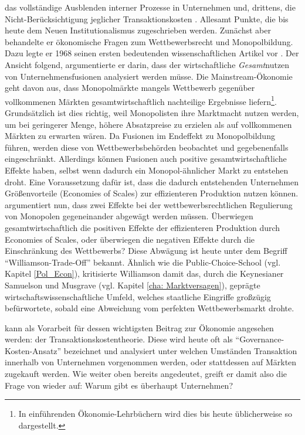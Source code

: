 das vollständige Ausblenden interner Prozesse in Unternehmen und, drittens, die Nicht-Berücksichtigung jeglicher Transaktionskosten \parencite{Williamson2009}. Allesamt Punkte, die bis heute dem Neuen Institutionalismus zugeschrieben werden. Zunächst aber behandelte er ökonomische Fragen zum Wettbewerbsrecht und Monopolbildung. Dazu legte er 1968 seinen ersten bedeutenden wissenschaftlichen Artikel vor \parencite{Williamson1968}. Der Ansicht \textcite{Coase1960, Coase1937} folgend, argumentierte er darin, dass der wirtschaftliche \textit{Gesamt}nutzen von Unternehmensfusionen analysiert werden müsse. Die Mainstream-Ökonomie geht davon aus, dass Monopolmärkte mangels Wettbewerb gegenüber vollkommenen Märkten gesamtwirtschaftlich nachteilige Ergebnisse liefern\footnote{In einführenden Ökonomie-Lehrbüchern wird dies bis heute üblicherweise so dargestellt.}. Grundsätzlich ist dies richtig, weil Monopolisten ihre Marktmacht nutzen werden, um bei geringerer Menge, höhere Absatzpreise zu erzielen als auf vollkommenen Märkten zu erwarten wären. Da Fusionen im Endeffekt zu Monopolbildung führen, werden diese von Wettbewerbsbehörden beobachtet und gegebenenfalls eingeschränkt. Allerdings können Fusionen auch positive gesamtwirtschaftliche Effekte haben, selbst wenn dadurch ein Monopol-ähnlicher Markt zu entstehen droht. Eine Voraussetzung dafür ist, dass die dadurch entstehenden Unternehmen Größenvorteile (Economies of Scales) zur effizienteren Produktion nutzen können. \textcite{Williamson1968} argumentiert nun, dass zwei Effekte bei der wettbewerbsrechtlichen Regulierung von Monopolen gegeneinander abgewägt werden müssen. Überwiegen gesamtwirtschaftlich die positiven Effekte der effizienteren Produktion durch Economies of Scales, oder überwiegen die negativen Effekte durch die Einschränkung des Wettbewerbs? Diese Abwägung ist heute unter dem Begriff "`Williamson-Trade-Off"' bekannt. Ähnlich wie die Public-Choice-School (vgl. Kapitel \ref{Pol_Econ}), kritisierte Williamson damit das, durch die Keynesianer Samuelson und Musgrave (vgl. Kapitel \ref{cha: Marktversagen}), geprägte wirtschaftswissenschaftliche Umfeld, welches staatliche Eingriffe großzügig befürwortete, sobald eine Abweichung vom perfekten Wettbewerbsmarkt drohte. 

\textcite{Williamson1968} kann als Vorarbeit für dessen wichtigsten Beitrag zur Ökonomie angesehen werden: der Transaktionskostentheorie. Diese wird heute oft als "`Governance-Kosten-Ansatz"' bezeichnet und analysiert unter welchen Umständen Transaktion innerhalb von Unternehmen vorgenommen werden, oder stattdessen auf Märkten zugekauft werden. Wie weiter oben bereits angedeutet, greift er damit also die Frage von \textcite{Coase1937} wieder auf: Warum gibt es überhaupt Unternehmen?

